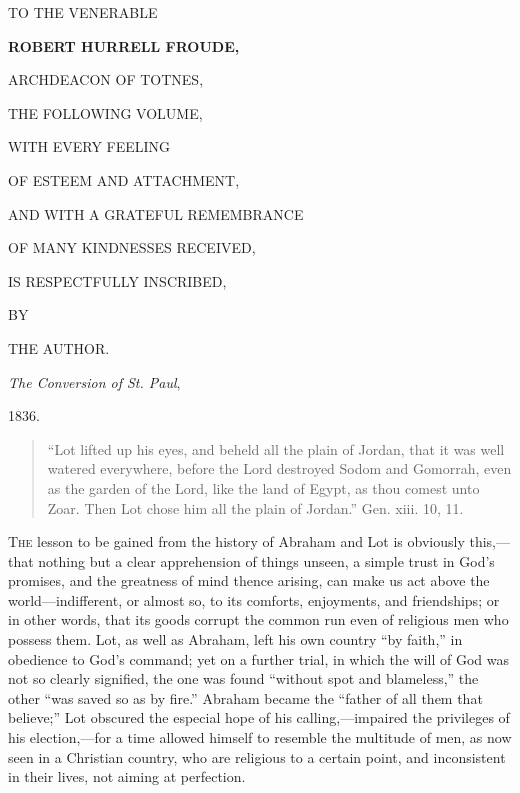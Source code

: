 




TO THE VENERABLE



\textbf{ROBERT HURRELL FROUDE,}



ARCHDEACON OF TOTNES,



THE FOLLOWING VOLUME,



WITH EVERY FEELING


OF ESTEEM AND ATTACHMENT,


AND WITH A GRATEFUL REMEMBRANCE


OF MANY KINDNESSES RECEIVED,


IS RESPECTFULLY INSCRIBED,


BY



THE AUTHOR.




\emph{The Conversion of St. Paul},

1836.


\begin{quote}

``Lot lifted up his eyes, and beheld all the plain of Jordan,
that it was well watered everywhere, before the Lord destroyed Sodom
and Gomorrah, even as the garden of the Lord, like the land of
Egypt, as thou comest unto Zoar. Then Lot chose him all the plain of
Jordan.'' Gen. xiii. 10, 11.

\end{quote}

T\textsc{he} lesson to be gained from the history of Abraham and Lot is
obviously this,—that nothing but a clear apprehension of things
unseen, a simple trust in God's promises, and the greatness of mind
thence arising, can make us act above the world—indifferent, or
almost so, to its comforts, enjoyments, and friendships; or in other
words, that its goods corrupt the common run even of religious men who
possess them. Lot, as well as Abraham, left his own country ``by
faith,'' in obedience to God's command; yet on a further trial,
in which the will of God was not so clearly signified, the one was
found ``without spot and blameless,'' the other ``was
saved so as by fire.'' Abraham became the ``father of all them
that believe;'' Lot obscured the especial hope of his calling,—impaired
the privileges of his election,—for a time allowed himself to
resemble the multitude of men, as now seen in a Christian country, who
are religious to a certain point, and inconsistent in their lives, not
aiming at perfection.

